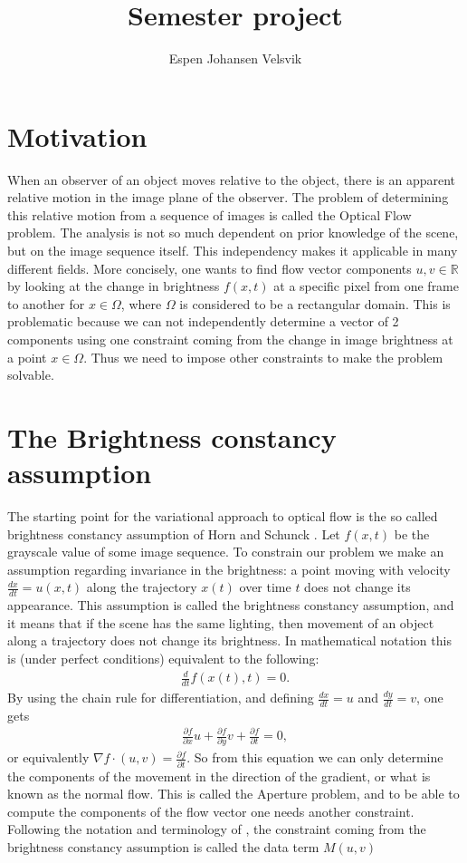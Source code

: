 \documentclass[10pt,a4paper]{article}
\begin{document}
\title{Semester project}
\author{Espen Johansen Velsvik}
\maketitle

\section{Motivation}
When an observer of an object moves relative to the object, there is an apparent relative motion in the image plane of the observer. The problem of determining this relative motion from a sequence of images is called the Optical Flow problem. The analysis is not so much dependent on prior knowledge of the scene, but on the image sequence itself. This independency makes it applicable in many different fields. More concisely, one wants to find flow vector components $u,v \in \mathbb{R}$ by looking at the change in brightness $f(x,t)$ at a specific pixel from one frame to another for $x \in \Omega$, where $\Omega$ is considered to be a rectangular domain. This is problematic because we can not independently determine a vector of 2 components using one constraint coming from the change in image brightness at a point $x \in \Omega$. Thus we need to impose other constraints to make the problem solvable.

\section{The Brightness constancy assumption}
The starting point for the variational approach to optical flow is the so called brightness constancy assumption of Horn and Schunck \cite{HS}. Let $f(x,t)$ be the grayscale value of some image sequence. To constrain our problem we make an assumption regarding invariance in the brightness: a point moving with velocity $\frac{dx}{dt} = u(x,t)$ along the trajectory $x(t)$ over time $t$ does not change its appearance. This assumption is called the brightness constancy assumption, and it means that if the scene has the same lighting, then movement of an object along a trajectory does not change its brightness. In mathematical notation this is (under perfect conditions) equivalent to the following:
\begin{align*}
\frac{d}{dt}f(x(t),t) = 0.
\end{align*}
By using the chain rule for differentiation, and defining $\frac{dx}{dt} = u$ and $\frac{dy}{dt} = v$, one gets
\begin{align*}
\frac{\partial f}{\partial x} u + \frac{\partial f}{\partial y} v + \frac{\partial f}{\partial t} = 0,
\end{align*}
or equivalently $\nabla f \cdot (u,v) = \frac{\partial f}{\partial t}$. So from this equation we can only determine the components of the movement in the direction of the gradient, or what is known as the normal flow. This is called the Aperture problem, and to be able to compute the components of the flow vector one needs another constraint. Following the notation and terminology of \cite{OFH}, the constraint coming from the brightness constancy assumption is called the data term $M(u,v)$
\end{document}
